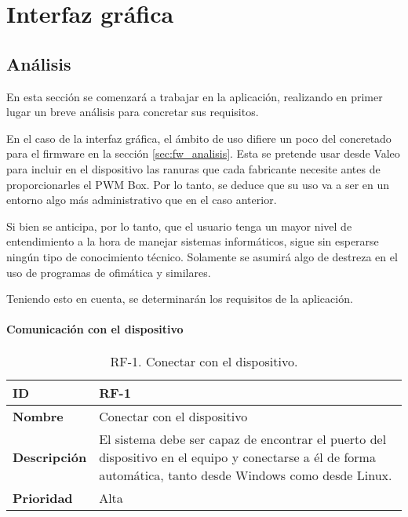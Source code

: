 \chapter{Interfaz gráfica}
\label{ch:ui}

\section{Análisis}
\label{sec:ui_analisis}

En esta sección se comenzará a trabajar en la aplicación, realizando en primer lugar un breve análisis para concretar sus requisitos.

En el caso de la interfaz gráfica, el ámbito de uso difiere un poco del concretado para el firmware en la sección \ref{sec:fw_analisis}. Esta se pretende usar desde Valeo para incluir en el dispositivo las ranuras que cada fabricante necesite antes de proporcionarles el PWM Box. Por lo tanto, se deduce que su uso va a ser en un entorno algo más administrativo que en el caso anterior.

Si bien se anticipa, por lo tanto, que el usuario tenga un mayor nivel de entendimiento a la hora de manejar sistemas informáticos, sigue sin esperarse ningún tipo de conocimiento técnico. Solamente se asumirá algo de destreza en el uso de programas de ofimática y similares.

Teniendo esto en cuenta, se determinarán los requisitos de la aplicación.

\subsubsection{Comunicación con el dispositivo}
\label{subsub:ui_requisitos}

\begin{table}[h!]
    \centering
    \caption{RF-1. Conectar con el dispositivo.}
    \begin{tabular}{|m{2.5cm}|m{9.27cm}|}
        \hline
        \textbf{ID} & RF-1 \\
        \hline
        \textbf{Nombre} & Conectar con el dispositivo \\
        \hline
        \textbf{Descripción} & El sistema debe ser capaz de encontrar el puerto del dispositivo en el equipo y conectarse a él de forma automática, tanto desde Windows como desde Linux. \\
        \hline
        \textbf{Prioridad} & Alta \\
        \hline
    \end{tabular}
\end{table}

